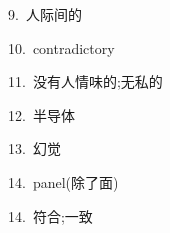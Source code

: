 \documentclass[a4paper, 12pt]{article}
\begin{document}
\begin{multicols}{2}
\begin{flushleft}
9.\ 人际间的 \ \ \ \ \underline{\hspace{3cm}}
\end{flushleft}

\begin{flushleft}
10.\ contradictory \ \ \ \ \underline{\hspace{3cm}}
\end{flushleft}
\end{multicols}

\begin{multicols}{2}
\begin{flushleft}
11.\ 没有人情味的;无私的 \ \ \ \ \underline{\hspace{3cm}}
\end{flushleft}

\begin{flushleft}
12.\ 半导体 \ \ \ \ \underline{\hspace{3cm}}
\end{flushleft}
\end{multicols}

\begin{multicols}{2}
\begin{flushleft}
13.\ 幻觉 \ \ \ \ \underline{\hspace{3cm}}
\end{flushleft}

\begin{flushleft}
14.\ panel(除了面) \ \ \ \ \underline{\hspace{3cm}}
\end{flushleft}
\end{multicols}

\begin{multicols}{2}
\begin{flushleft}
14.\ 符合;一致 \ \ \ \ \underline{\hspace{3cm}}
\end{flushleft}
\end{multicols}
\end{document}
